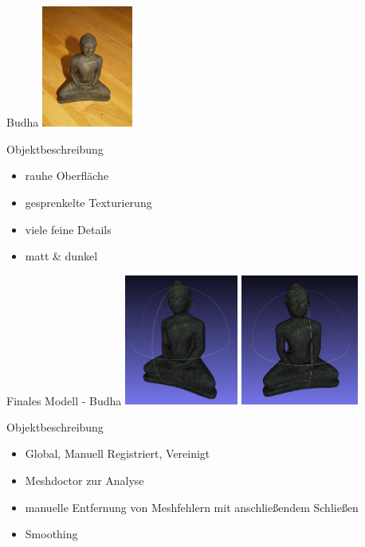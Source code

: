 \documentclass[11pt]{beamer}
\begin{document}
\begin{frame}{Budha}
\center
	\includegraphics[width=3cm]{images/budha/Budha_original.jpg}
	\begin{block}{Objektbeschreibung}
		\begin{itemize}
			\item rauhe Oberfläche
			\item gesprenkelte Texturierung
			\item viele feine Details
			\item matt \& dunkel
		\end{itemize}
	\end{block}

\end{frame}

\begin{frame}{Finales Modell - Budha}
\center
	\includegraphics[height=4.3cm]{images/budha/Budha_3DScan_Untextured_2.png}
	\includegraphics[height=4.3cm]{images/budha/Budha_3DScan_Untextured.png}
	\begin{block}{Objektbeschreibung}
		\begin{itemize}
			\item Global, Manuell Registriert, Vereinigt
			\item Meshdoctor zur Analyse
			\item manuelle Entfernung von Meshfehlern mit anschließendem Schließen
			\item Smoothing
		\end{itemize}
	\end{block}
\end{frame}
\end{document}
